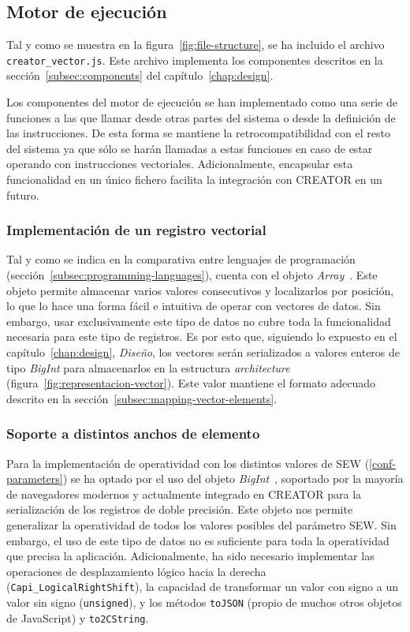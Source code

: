 \subsection{Motor de ejecución}{\label{implementation:motor}}
Tal y como se muestra en la figura~\ref{fig:file-structure}, se ha incluido el archivo \texttt{creator\_vector.js}. Este archivo implementa los componentes descritos en la sección~\ref{subsec:components} del capítulo~\ref{chap:design}\@.

Los componentes del motor de ejecución se han implementado como una serie de funciones a las que llamar desde otras partes del sistema o desde la definición de las instrucciones. De esta forma se mantiene la retrocompatibilidad con el resto del sistema ya que sólo se harán llamadas a estas funciones en caso de estar operando con instrucciones vectoriales. Adicionalmente, encapsular esta funcionalidad en un único fichero facilita la integración con CREATOR en un futuro.

\subsubsection{Implementación de un registro vectorial}

Tal y como se indica en la comparativa entre lenguajes de programación (sección~\ref{subsec:programming-languages}), {\js} cuenta con el objeto \textit{Array}~\cite{js-array}. Este objeto permite almacenar varios valores consecutivos y localizarlos por posición, lo que lo hace una forma fácil e intuitiva de operar con vectores de datos. Sin embargo, usar exclusivamente este tipo de datos no cubre toda la funcionalidad necesaria para este tipo de registros. Es por esto que, siguiendo lo expuesto en el capítulo~\ref{chap:design}, \textit{Diseño}, los vectores serán serializados a valores enteros de tipo \textit{BigInt} para almacenarlos en la estructura \textit{architecture} (figura~\ref{fig:representacion-vector}). Este valor mantiene el formato adecuado descrito en la sección~\ref{subsec:mapping-vector-elements}\@.

\subsubsection{Soporte a distintos anchos de elemento}

Para la implementación de operatividad con los distintos valores de SEW (\ref{conf-parameters}) se ha optado por el uso del objeto \textit{BigInt}~\cite{bigint}, soportado por la mayoría de navegadores modernos y actualmente integrado en CREATOR para la serialización de los registros de doble precisión. Este objeto nos permite generalizar la operatividad de todos los valores posibles del parámetro SEW\@. Sin embargo, el uso de este tipo de datos no es suficiente para toda la operatividad que precisa la aplicación. Adicionalmente, ha sido necesario implementar las operaciones de desplazamiento lógico hacia la derecha (\texttt{Capi\_LogicalRightShift}), la capacidad de transformar un valor con signo a un valor sin signo (\texttt{unsigned}), y los métodos \texttt{toJSON} (propio de muchos otros objetos de JavaScript) y \texttt{to2CString}. 

